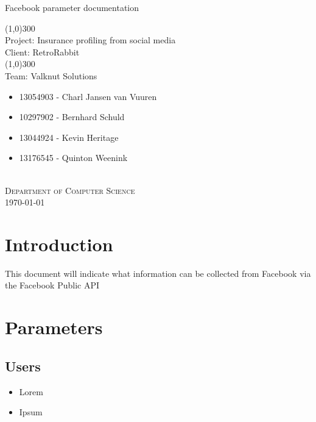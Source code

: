 \documentclass{article}
\begin{document}
	\begin{titlepage}
		\begin{center}
			\huge{
			Facebook parameter documentation\\
			}
			
			\line(1,0){300}\\
			[0.2cm]
			\LARGE{Project: Insurance profiling from social media\\
			Client: RetroRabbit} \\
			\line(1,0){300}\\
			\LARGE{Team: Valknut Solutions}\\
			[1.0cm]
			\large
			{
			\begin{itemize}
				\item 13054903 - Charl Jansen van Vuuren 
				\item 10297902 - Bernhard Schuld      
				\item 13044924 - Kevin Heritage
				\item 13176545 - Quinton Weenink\\
			\end{itemize}
			}
			\textsc{\large}\\
		[3.0cm]
		\textsc{\large  Department of Computer Science}\\
		[0.5cm]
		\textsc{\large \today}\\
		\end{center}

	\end{titlepage}
	\cleardoublepage
	\tableofcontents
\section{Introduction}
This document will indicate what information can be collected from Facebook via the Facebook Public API
\section{Parameters}
	\subsection{Users}
		\begin{itemize}
			\item Lorem
			\item Ipsum
		\end{itemize}
\end{document}

